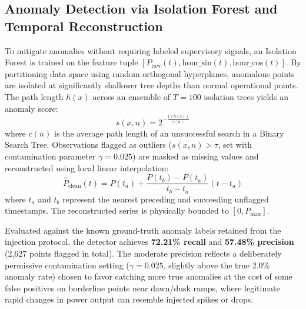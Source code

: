 \documentclass[conference]{IEEEtran}
\begin{document}
\subsection{Anomaly Detection via Isolation Forest and Temporal Reconstruction}
To mitigate anomalies without requiring labeled supervisory signals, an Isolation Forest is trained on the feature tuple $[P_{\text{raw}}(t), \text{hour\_sin}(t), \text{hour\_cos}(t)]$. By partitioning data space using random orthogonal hyperplanes, anomalous points are isolated at significantly shallower tree depths than normal operational points. The path length $h(x)$ across an ensemble of $T=100$ isolation trees yields an anomaly score:
\begin{equation}
s(x, n) = 2^{-\frac{\mathbb{E}(h(x))}{c(n)}}
\end{equation}
where $c(n)$ is the average path length of an unsuccessful search in a Binary Search Tree. Observations flagged as outliers ($s(x,n) > \tau$, set with contamination parameter $\gamma = 0.025$) are masked as missing values and reconstructed using local linear interpolation:
\begin{equation}
\hat{P}_{\text{clean}}(t) = P(t_a) + \frac{P(t_b) - P(t_a)}{t_b - t_a}(t - t_a)
\end{equation}
where $t_a$ and $t_b$ represent the nearest preceding and succeeding unflagged timestamps. The reconstructed series is physically bounded to $[0, P_{\text{max}}]$.

Evaluated against the known ground-truth anomaly labels retained from the injection protocol, the detector achieves \textbf{72.21\% recall} and \textbf{57.48\% precision} (2{,}627 points flagged in total). The moderate precision reflects a deliberately permissive contamination setting ($\gamma=0.025$, slightly above the true 2.0\% anomaly rate) chosen to favor catching more true anomalies at the cost of some false positives on borderline points near dawn/dusk ramps, where legitimate rapid changes in power output can resemble injected spikes or drops.
\end{document}
